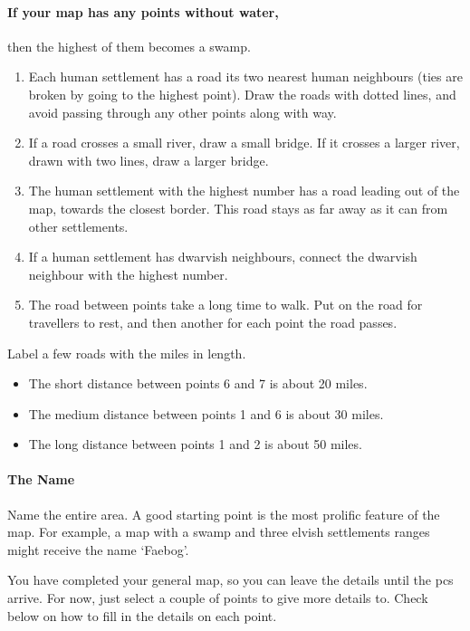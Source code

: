 \begin{multicols}{2}
\paragraph{If your map has any points without water,}
then the highest of them becomes a swamp.


\begin{enumerate}
  \item
  Each human settlement has a road its two nearest human neighbours (ties are broken by going to the highest point).
  Draw the roads with dotted lines, and avoid passing through any other points along with way.
  \item
  If a road crosses a small river, draw a small bridge.
  If it crosses a larger river, drawn with two lines, draw a larger bridge.
  \item
  The human settlement with the highest number has a road leading out of the map, towards the closest border.
  This road stays as far away as it can from other settlements.
  \label{roadOut}
  \item
  If a human settlement has dwarvish neighbours, connect the dwarvish neighbour with the highest number.
  \item
  The road between points take a long time to walk.
  Put  on the road for travellers to rest, and then another for each point the road passes.
\end{enumerate}

Label a few roads with the miles in length.

\begin{itemize}
  \item
  The short distance between points 6 and 7 is about 20 miles.
  \item
  The medium distance between points 1 and 6 is about 30 miles.
  \item
  The long distance between points 1 and 2 is about 50 miles.
\end{itemize}

\paragraph{The Name}

Name the entire area.
A good starting point is the most prolific feature of the map.
For example, a map with a swamp and three elvish settlements ranges might receive the name `Faebog'.

You have completed your general map, so you can leave the details until the \glspl{pc} arrive.
For now, just select a couple of points to give more details to.
Check below on how to fill in the details on each point.

\end{multicols}

